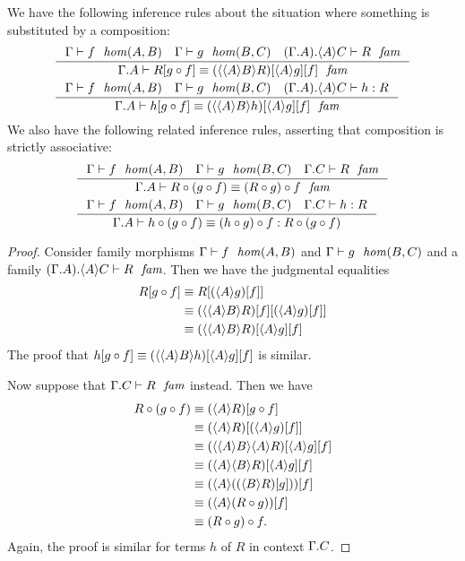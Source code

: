 \begin{lem}
We have the following inference rules about the situation where something is
substituted by a composition:
\begin{align*}
& \inference
  {\jhom{\Gamma}{A}{B}{f}
    \jhom{\Gamma}{B}{C}{g}
    \jfam{{{\Gamma}{A}}{\ctxwk{A}{C}}}{R}}
  {\jfameq
    {{\Gamma}{A}}
    {\subst{\jcomp{A}{f}{g}}{R}}
    {\subst{f}{{\ctxwk{A}{g}}{\ctxwk{{A}{B}}{R}}}}}\\
& \inference
  {\jhom{\Gamma}{A}{B}{f}
    \jhom{\Gamma}{B}{C}{g}
    \jterm{{{\Gamma}{A}}{\ctxwk{A}{C}}}{R}{h}}
  {\jfameq
    {{\Gamma}{A}}
    {\subst{\jcomp{A}{f}{g}}{h}}
    {\subst{f}{{\ctxwk{A}{g}}{\ctxwk{{A}{B}}{h}}}}}
\end{align*}
We also have the following related inference rules, asserting that composition
is strictly associative:
\begin{align*}
& \inference
    {\jhom{\Gamma}{A}{B}{f}
      \jhom{\Gamma}{B}{C}{g}
      \jfam{{\Gamma}{C}}{R}}
    {\jfameq
      {{\Gamma}{A}}
      {\jcomp{A}{{A}{f}{g}}{R}}
      {\jcomp{A}{f}{{B}{g}{R}}}}\\
& \inference
    {\jhom{\Gamma}{A}{B}{f}
      \jhom{\Gamma}{B}{C}{g}
      \jterm{{\Gamma}{C}}{R}{h}}
    {\jtermeq
      {{\Gamma}{A}}
      {\jcomp{A}{{A}{f}{g}}{R}}
      {\jcomp{A}{{A}{f}{g}}{h}}
      {\jcomp{A}{f}{{B}{g}{h}}}}
\end{align*}
\end{lem}

\begin{proof}
Consider family morphisms $\jhom{\Gamma}{A}{B}{f}$ and $\jhom{\Gamma}{B}{C}{g}$
and a family $\jfam{{{\Gamma}{A}}{\ctxwk{A}{C}}}{R}$. Then we have the judgmental
equalities
\begin{align*}
\subst{\jcomp{A}{f}{g}}{R} & \jdeq \subst{{f}{\ctxwk{A}{g}}}{R}\\
& \jdeq \subst{{f}{\ctxwk{A}{g}}}{\subst{f}{\ctxwk{{A}{B}}{R}}}\\
& \jdeq \subst{f}{{\ctxwk{A}{g}}{\ctxwk{{A}{B}}{R}}}
\end{align*}
The proof that 
$\subst{\jcomp{A}{f}{g}}{h}\jdeq\subst{f}{{\ctxwk{A}{g}}{\ctxwk{{A}{B}}{h}}}$
is similar.

Now suppose that $\jfam{{\Gamma}{C}}{R}$ instead. Then we have
\begin{align*}
\jcomp{A}{{A}{f}{g}}{R} & \jdeq \subst{\jcomp{A}{f}{g}}{\ctxwk{A}{R}}\\
& \jdeq \subst{{f}{\ctxwk{A}{g}}}{\ctxwk{A}{R}}\\
& \jdeq \subst{f}{{\ctxwk{A}{g}}{\ctxwk{{A}{B}}{{A}{R}}}}\\
& \jdeq \subst{f}{{\ctxwk{A}{g}}{\ctxwk{A}{{B}{R}}}}\\
& \jdeq \subst{f}{\ctxwk{A}{\subst{g}{\ctxwk{B}{R}}}}\\
& \jdeq \subst{f}{\ctxwk{A}{\jcomp{B}{g}{R}}}\\
& \jdeq \jcomp{A}{f}{{B}{g}{R}}.
\end{align*}
Again, the proof is similar for terms $h$ of $R$ in context $\ctxext{\Gamma}{C}$.
\end{proof}


